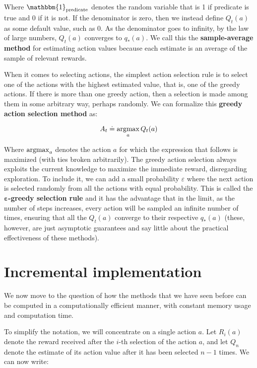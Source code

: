Where $\mathbbm{1}_{\text{predicate}}$ denotes the random variable that is 1 if predicate is true and 0 if it is not. If the denominator is zero, then we instead define $Q_t(a)$  as some default value, such as 0. As the denominator goes to infinity, by the law of large numbers, $Q_t(a)$ converges to $q_*(a)$. We call this the \textbf{sample-average method} for estimating action values because each estimate is an average of the sample of relevant rewards.

When it comes to selecting actions, the simplest action selection rule is to select one of the actions with the highest estimated value, that is, one of the greedy actions. If there is more than one greedy action, then a selection is made among them in some arbitrary way, perhaps randomly. We can formalize this \textbf{greedy action selection method} as:

\begin{equation}
    A_t \doteq \operatorname*{argmax}_a  Q_t(a)
    \label{eq:ch3-greedyactionselectionmethod}
\end{equation}

Where $\operatorname*{argmax}_a$ denotes the action $a$ for which the expression that follows is maximized (with ties broken arbitrarily). The greedy action selection always exploits the current knowledge to maximize the immediate reward, disregarding exploration. To include it, we can add a small probability $\varepsilon$ where the next action is selected randomly from all the actions with equal probability. This is called the \textbf{$\boldsymbol{\varepsilon}$-greedy selection rule} and it has the advantage that in the limit, as the number of steps increases, every action will be sampled an infinite number of times, ensuring that all the $Q_t(a)$ converge to their respective $q_*(a)$ (these, however, are just asymptotic guarantees and say little about the practical effectiveness of these methods).

\section{Incremental implementation}
\label{section:incrementalimplementation}
We now move to the question of how the methods that we have seen before can be computed in a computationally efficient manner, with constant memory usage and computation time.

To simplify the notation, we will concentrate on a single action $a$. Let $R_i(a)$ denote the reward received after the $i$-th selection of the action $a$, and let $Q_n$ denote the estimate of its action value after it has been selected $n-1$ times. We can now write:

